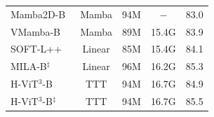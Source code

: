 \documentclass[11pt]{article}
\begin{document}
\begin{table}[htbp]
{\begin{tabular}{l|c|c c|c}
            \midrule
            Mamba2D-B~ 
            & Mamba         & 94M       & $-$       & 83.0 \\
            VMamba-B~ 
            & Mamba         & 89M       & 15.4G     & 83.9 \\
            SOFT-L++~
            & Linear        & 85M       & 15.4G     & 84.1 \\
            MILA-B$^\ddag$~
            & Linear        & 96M       & 16.2G     & 85.3 \\
            \rowcolor{lightgray!20} H-ViT$^3$-B
            & TTT           & 94M       & 16.7G     & 84.9 \\
            \rowcolor{lightgray!20} H-ViT$^3$-B$^\ddag$
            & TTT           & 94M       & 16.7G     & 85.5 \\
            
            \bottomrule
        \end{tabular}
}
\end{table}
\end{document}
